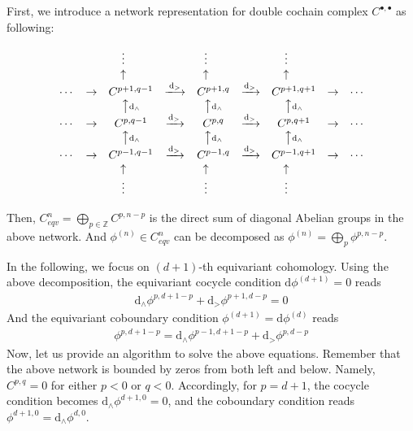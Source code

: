 \documentclass[reprint,amsmath,amssymb,aps,pra,]{revtex4-1}
\newcommand{\dd}{\mathrm{d}} %
\newcommand{\ZZ}{\mathbb{Z}} %
\begin{document}
First, we introduce a network representation for double cochain complex $C^{\bullet,\bullet}$ as following:
\begin{widetext}
  \begin{align}
    \begin{matrix}
      & & \vdots\quad\  & & \vdots\quad\ & & \vdots\quad\ & &\\
      & & \uparrow\quad\  & & \uparrow\quad\ & & \uparrow\quad\ & &\\
    \cdots & \rightarrow & C^{p+1,q-1} & \xlongrightarrow{\dd_>} & C^{p+1,q} & \xrightarrow{\dd_>} & C^{p+1,q+1} & \rightarrow & \cdots\\
    & & \big\uparrow \text{\scriptsize$\dd_\wedge$} & & \big\uparrow \text{\scriptsize$\dd_\wedge$} && \big\uparrow  \text{\scriptsize$\dd_\wedge$} & & \\
    \cdots & \rightarrow & C^{p,q-1} & \xrightarrow{\dd_>} & C^{p,q} & \xrightarrow{\dd_>} & C^{p,q+1} & \rightarrow & \cdots\\
    & & \big\uparrow \text{\scriptsize$\dd_\wedge$} & & \big\uparrow \text{\scriptsize$\dd_\wedge$} && \big\uparrow  \text{\scriptsize$\dd_\wedge$} & & \\
    \cdots & \rightarrow & C^{p-1,q-1} & \xrightarrow{\dd_>} & C^{p-1,q} & \xrightarrow{\dd_>} & C^{p-1,q+1} & \rightarrow & \cdots\\
      & & \uparrow\quad\  & & \uparrow\quad\ & & \uparrow\quad\ & &\\
      & & \vdots\quad\  & & \vdots\quad\ & & \vdots\quad\ & &\\
  \end{matrix}
    \label{eq:double_cochain_network}
  \end{align}
\end{widetext}
Then, $C^{n}_{eqv}=\bigoplus_{p\in\ZZ} C^{p,n-p}$ is the direct sum of diagonal Abelian groups in the above network.
And $\phi^{(n)}\in C^{n}_{eqv}$ can be decomposed as $\phi^{(n)}=\bigoplus_{p}\phi^{p,n-p}$.

In the following, we focus on $(d+1)$-th equivariant cohomology.
Using the above decomposition, the equivariant cocycle condition $\dd\phi^{(d+1)}=0$ reads
\begin{align}
  \dd_\wedge\phi^{p,d+1-p}+\dd_>\phi^{p+1,d-p}=0
  \label{eq:equivariant_cocycle_equation}
\end{align}
And the equivariant coboundary condition $\phi^{(d+1)}=\dd\phi^{(d)}$ reads
\begin{align}
  \phi^{p,d+1-p}=\dd_\wedge\phi^{p-1,d+1-p}+\dd_>\phi^{p,d-p}
  \label{eq:equivariant_coboundary_equation}
\end{align}
Now, let us provide an algorithm to solve the above equations.
Remember that the above network is bounded by zeros from both left and below.
Namely, $C^{p,q}=0$ for either $p<0$ or $q<0$.
Accordingly, for $p=d+1$, the cocycle condition becomes $\dd_\wedge\phi^{d+1,0}=0$, and the coboundary condition reads $\phi^{d+1,0}=\dd_\wedge\phi^{d,0}$.
\end{document}

